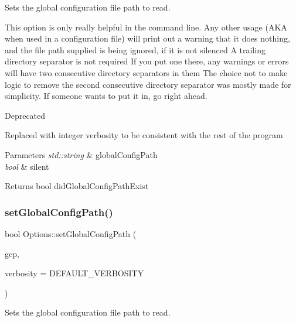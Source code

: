 Sets the global configuration file path to read. 

This option is only really helpful in the command line. Any other usage (A\+KA when used in a configuration file) will print out a warning that it does nothing, and the file path supplied is being ignored, if it is not silenced A trailing directory separator is not required If you put one there, any warnings or errors will have two consecutive directory separators in them The choice not to make logic to remove the second consecutive directory separator was mostly made for simplicity. If someone wants to put it in, go right ahead.

\begin{DoxyRefDesc}{Deprecated}
\item[\mbox{\hyperlink{deprecated__deprecated000009}{Deprecated}}]Replaced with integer verbosity to be consistent with the rest of the program\end{DoxyRefDesc}



\begin{DoxyParams}{Parameters}
{\em std\+::string} & global\+Config\+Path \\
\hline
{\em bool} & silent\\
\hline
\end{DoxyParams}
\begin{DoxyReturn}{Returns}
bool did\+Global\+Config\+Path\+Exist 
\end{DoxyReturn}
\mbox{\label{classOptions_a641d24b137d0c815613b74e42eadcb25}} 
\subsubsection{\texorpdfstring{setGlobalConfigPath()}{setGlobalConfigPath()}\hspace{0.1cm}{\footnotesize\ttfamily [2/2]}}
{\footnotesize\ttfamily bool Options\+::set\+Global\+Config\+Path (\begin{DoxyParamCaption}\item[{std\+::string}]{gcp,  }\item[{unsigned int}]{verbosity = {\ttfamily DEFAULT\+\_\+VERBOSITY} }\end{DoxyParamCaption})}



Sets the global configuration file path to read. 

